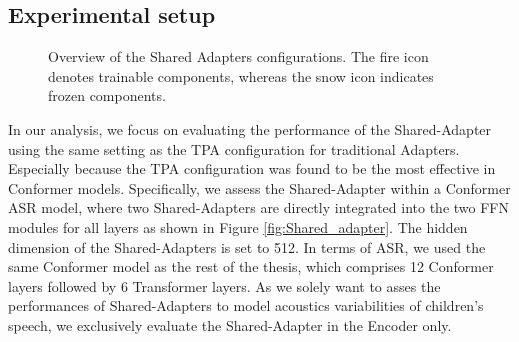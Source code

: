 \subsection{Experimental setup}
\begin{figure}[t]
    \centering
    \caption{Overview of the Shared Adapters configurations. The fire icon denotes trainable components, whereas the snow icon indicates frozen components.}
\end{figure}


In our analysis, we focus on evaluating the performance of the Shared-Adapter using the same setting as the \ac{TPA} configuration for traditional Adapters. Especially because the \ac{TPA} configuration was found to be the most effective in Conformer models. Specifically, we assess the Shared-Adapter within a Conformer \ac{ASR} model, where two Shared-Adapters are directly integrated into the two \ac{FFN} modules for all layers as shown in Figure \ref{fig:Shared_adapter}.  The hidden dimension of the Shared-Adapters is set to 512. In terms of \ac{ASR}, we used the same Conformer model as the rest of the thesis, which comprises 12 Conformer layers followed by 6 Transformer layers. As we solely want to asses the performances of Shared-Adapters to model acoustics variabilities of children's speech, we exclusively evaluate the Shared-Adapter in the Encoder only.

